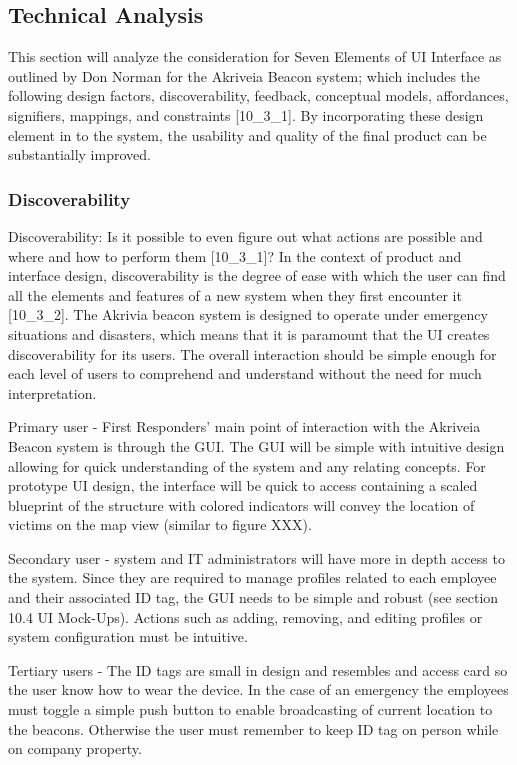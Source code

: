 

\subsection{Technical Analysis}
\bigskip
This section will analyze the consideration for Seven Elements of UI Interface as outlined by Don Norman for the Akriveia Beacon system; which includes the following design factors, discoverability, feedback, conceptual models, affordances, signifiers, mappings, and constraints [10\_3\_1]. By incorporating these design element in to the system, the usability and quality of the final product can be substantially improved. 


\subsubsection{Discoverability}
\medskip
Discoverability: Is it possible to even figure out what actions are possible and where and how to perform them [10\_3\_1]?  In the context of product and interface design, discoverability is the degree of ease with which the user can find all the elements and features of a new system when they first encounter it [10\_3\_2]. The Akrivia beacon system is designed to operate under emergency situations and disasters, which means that it is paramount that the UI creates discoverability for its users. The overall interaction should be simple enough for each level of users to comprehend and understand without the need for much interpretation. 

\bigskip
Primary user - First Responders’ main point of interaction with the Akriveia Beacon system is through the GUI. The GUI will be simple with intuitive design allowing for quick understanding of the system and any relating concepts. For prototype UI design, the interface will be quick to access containing a scaled blueprint of the structure with colored indicators will convey the location of victims on the map view (similar to figure XXX). 

\bigskip
Secondary user - system and IT administrators will have more in depth access to the system. Since they are required to manage profiles related to each employee and their associated ID tag, the GUI needs to be simple and robust (see section 10.4 UI Mock-Ups). Actions such as adding, removing, and editing profiles or system configuration must be intuitive. 

\bigskip
Tertiary users - The ID tags are small in design and resembles and access card so the user know how to wear the device. In the case of an emergency the employees must toggle a simple push button to enable broadcasting of current location to the beacons. Otherwise the user must remember to keep ID tag on person while on company property.
\bigskip



